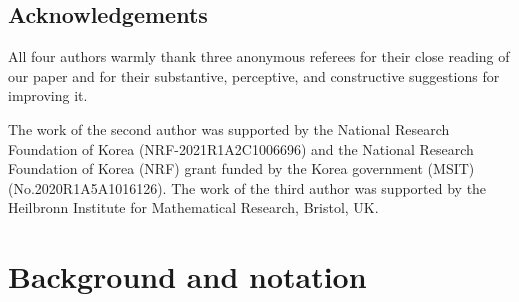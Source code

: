 \documentclass[12pt,amstex,amssymb]{article}
\theoremstyle{plain}
\theoremstyle{definition}
\def\Z{{\mathbb Z}}
\def\Q{{\mathbb Q}}
\newcommand{\GL}{\operatorname{GL}}
\begin{document}
%
%
%







\subsection{Acknowledgements}
All four authors warmly thank three anonymous referees for their close reading of our paper and for their  substantive, perceptive, and constructive suggestions for improving it. 
 
The work of 
the second author was supported by the National Research Foundation of Korea (NRF-2021R1A2C1006696) and the National Research Foundation of Korea (NRF) grant funded by the Korea government (MSIT) (No.2020R1A5A1016126).  The work of the third author was supported by the Heilbronn Institute for Mathematical Research, Bristol, UK.

\section{Background and notation}\label{background}
\end{document}
